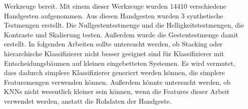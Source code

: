 Werkzeuge bereit. Mit einem dieser Werkzeuge wurden 14410 verschiedene Handgesten aufgenommen. Aus diesen Handgesten wurden 3 synthetische Testmengen erstellt. Die Nullgestentestmenge und die
Helligkeitstestmengen, die Kontraste und Skalierung testen. Außerdem wurde die Gestentestmenge damit erstellt.
\newline
\newline
In folgenden Arbeiten sollte untersucht werden, ob Stacking oder hierarchische Klassifizierer nicht besser geeignet sind für Klassifizierer mit Entscheidungsbäumen auf kleinen eingebetteten Systemen.
Es wird vermutet, dass dadurch simplere Klassifizierer generiert werden können, die simplere Featuremengen verwenden können. Außerdem könnte untersucht werden, ob KNNs nicht wesentlich kleiner sein
können, wenn die Features dieser Arbeit verwendet werden, anstatt die Rohdaten der Handgeste.